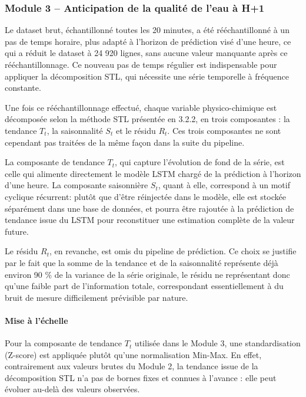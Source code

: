 \documentclass[a4paper,12pt, oneside]{article}
\begin{document}
\subsubsection[Module 3]{Module 3 -- Anticipation de la qualité de l'eau à H+1\\}
Le dataset brut, échantillonné toutes les 20 minutes, a été rééchantillonné à un pas de temps horaire, plus adapté à l'horizon de prédiction visé d'une heure, ce qui a réduit le dataset à 24 920 lignes, sans aucune valeur manquante après ce rééchantillonnage. Ce nouveau pas de temps régulier est indispensable pour appliquer la décomposition STL, qui nécessite une série temporelle à fréquence constante.

Une fois ce rééchantillonnage effectué, chaque variable physico-chimique est décomposée selon la méthode STL présentée en 3.2.2, en trois composantes : la tendance $T_t$, la saisonnalité $S_t$ et le résidu $R_t$. Ces trois composantes ne sont cependant pas traitées de la même façon dans la suite du pipeline.

La composante de tendance $T_t$, qui capture l'évolution de fond de la série, est celle qui alimente directement le modèle LSTM chargé de la prédiction à l'horizon d'une heure. La composante saisonnière $S_t$, quant à elle, correspond à un motif cyclique récurrent: plutôt que d'être réinjectée dans le modèle, elle est stockée séparément dans une base de données, et pourra être rajoutée à la prédiction de tendance issue du LSTM pour reconstituer une estimation complète de la valeur future.

Le résidu $R_t$, en revanche, est omis du pipeline de prédiction. Ce choix se justifie par le fait que la somme de la tendance et de la saisonnalité représente déjà environ 90 \% de la variance de la série originale, le résidu ne représentant donc qu'une faible part de l'information totale, correspondant essentiellement à du bruit de mesure difficilement prévisible par nature.

\paragraph{Mise à l'échelle\\}
Pour la composante de tendance $T_t$ utilisée dans le Module 3, une standardisation (Z-score) est appliquée plutôt qu'une normalisation Min-Max. En effet, contrairement aux valeurs brutes du Module 2, la tendance issue de la décomposition STL n'a pas de bornes fixes et connues à l'avance : elle peut évoluer au-delà des valeurs observées.
\end{document}
